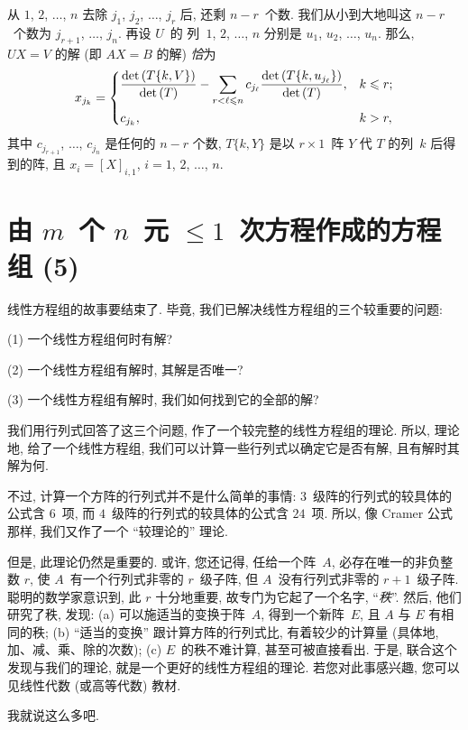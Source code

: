 \begin{theorem}
    从 \(1\), \(2\), \(\dots\), \(n\)
    去除 \(j_1\), \(j_2\), \(\dots\), \(j_r\)
    后, 还剩 \(n - r\)~个数.
    我们从小到大地叫这 \(n - r\)~个数为
    \(j_{r+1}\), \(\dots\), \(j_n\).
    再设 \(U\)~的%
    列~\(1\), \(2\), \(\dots\), \(n\)
    分别是 \(u_1\), \(u_2\), \(\dots\), \(u_n\).
    那么, \(UX = V\) 的解 (即 \(AX = B\) 的解) \emph{恰}为
    \begin{align*}
        x_{j_k}
        = \begin{dcases}
              \frac{\det {(T\{k,V\})}}{\det {(T)}}
              - \sum_{r < \ell \leq n}
              {c_{j_\ell}
              \frac{\det {(T\{k,u_{j_\ell}\})}}{\det {(T)}}},
               & k \leq r; \\
              c_{j_k},
               & k > r,
          \end{dcases}
    \end{align*}
    其中
    \(c_{j_{r+1}}\), \(\dots\), \(c_{j_n}\)
    是任何的 \(n-r\) 个数,
    \(T\{k,Y\}\) 是以 \(r \times 1\)~阵 \(Y\)
    代 \(T\) 的列~\(k\) 后得到的阵,
    且 \(x_i = [X]_{i,1}\),
    \(i = 1\), \(2\), \(\dots\), \(n\).
\end{theorem}

\section{\texorpdfstring{由 \(m\)~个 \(n\)~元
      \({\leq} 1\)~次方程作成的方程组 (5)}%
  {由 m 个 n 元 ≤1 次方程作成的方程组 (5)}}

\maldevigalegajxo

线性方程组的故事要结束了.
毕竟, 我们已解决线性方程组的三个较重要的问题:

(1)
一个线性方程组何时有解?

(2)
一个线性方程组有解时, 其解是否唯一?

(3)
一个线性方程组有解时, 我们如何找到它的全部的解?

我们用行列式回答了这三个问题,
作了一个较完整的线性方程组的理论.
所以, 理论地, 给了一个线性方程组,
我们可以计算一些行列式以确定它是否有解,
且有解时其解为何.

不过,
计算一个方阵的行列式并不是什么简单的事情:
\(3\)~级阵的行列式的较具体的公式含 \(6\)~项,
而 \(4\)~级阵的行列式的较具体的公式含 \(24\)~项.
所以, 像 Cramer 公式那样,
我们又作了一个 ``较理论的'' 理论.

但是, 此理论仍然是重要的.
或许, 您还记得,
任给一个阵~\(A\),
必存在唯一的非负整数 \(r\),
使 \(A\)~有一个行列式非零的 \(r\)~级子阵,
但 \(A\)~没有行列式非零的 \(r+1\)~级子阵.
聪明的数学家意识到,
此 \(r\) 十分地重要,
故专门为它起了一个名字, ``\emph{秩}''.
然后, 他们研究了秩,
发现:
(a)
可以施适当的变换于阵~\(A\),
得到一个新阵~\(E\),
且 \(A\) 与 \(E\) 有相同的秩;
(b)
``适当的变换'' 跟计算方阵的行列式比,
有着较少的计算量
(具体地, 加、减、乘、除的次数);
(c)
\(E\)~的秩不难计算,
甚至可被直接看出.
于是, 联合这个发现与我们的理论,
就是一个更好的线性方程组的理论.
若您对此事感兴趣,
您可以见线性代数 (或高等代数) 教材.

我就说这么多吧.

\SenAsteriskoEnEnhavtabelo
